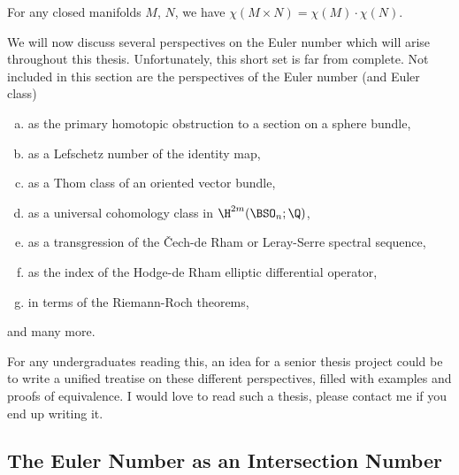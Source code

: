 \begin{proposition}
  For any closed manifolds $M$, $N$, we have $\chi(M\times N)=\chi(M)\cdot \chi(N)$.
\end{proposition}

We will now discuss several perspectives on the Euler number which will arise throughout this thesis. Unfortunately, this short set is far from complete. Not included in this section are the perspectives of the Euler number (and Euler class) 
\begin{enumerate}[(a)]
  \item as the primary homotopic obstruction to a section on a sphere bundle,
  \item as a Lefschetz number of the identity map,
  \item as a Thom class of an oriented vector bundle,
  \item as a universal cohomology class in $\H^{2m}(\BSO_n; \Q)$,
  \item as a transgression of the \v{C}ech-de Rham or Leray-Serre spectral sequence,
  \item as the index of the Hodge-de Rham elliptic differential operator,
  \item in terms of the Riemann-Roch theorems,
\end{enumerate}
and many more. 

\begin{remark}
  For any undergraduates reading this, an idea for a senior thesis project could be to write a unified treatise on these different perspectives, filled with examples and proofs of equivalence. I would love to read such a thesis, please contact me if you end up writing it.
\end{remark}

\subsection{The Euler Number as an Intersection Number}\label{sec:euler-number-intersection}

